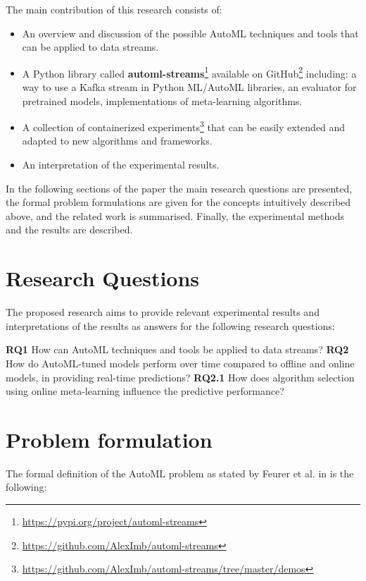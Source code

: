 \documentclass{sig-alternate-br}
\begin{document}
The main contribution of this research consists of:
\begin{itemize}
  \item An overview and discussion of the possible AutoML techniques and tools that can be applied to data streams.
  \item A Python library called \textbf{automl-streams}\footnote{\url{https://pypi.org/project/automl-streams}} available on GitHub\footnote{\url{https://github.com/AlexImb/automl-streams}} including: a way to use a Kafka stream in Python ML/AutoML libraries, an evaluator for pretrained models, implementations of meta-learning algorithms.
  \item A collection of containerized experiments\footnote{\url{https://github.com/AlexImb/automl-streams/tree/master/demos}} that can be easily extended and adapted to new algorithms and frameworks.
  \item An interpretation of the experimental results.
 
\end{itemize}

In the following sections of the paper the main research questions are presented, the formal problem formulations are given for the concepts intuitively described above, and the related work is summarised. Finally, the experimental methods and the results are described.

\section{Research Questions}
The proposed research aims to provide relevant experimental results and interpretations of the results as answers for the following research questions: 

\textbf{RQ1} How can AutoML techniques and tools be applied to data streams?
\newline
\newline
\textbf{RQ2} How do AutoML-tuned models perform over time compared to offline and online models, in providing real-time predictions?
		\newline\-\hspace{0.5cm}\textbf{RQ2.1} How does algorithm selection using online meta-learning influence the predictive performance?
    
\section{Problem formulation}
The formal definition of the AutoML problem as stated by Feurer et al. in \cite{feurer2015autosklearn} is the following:
\end{document}
